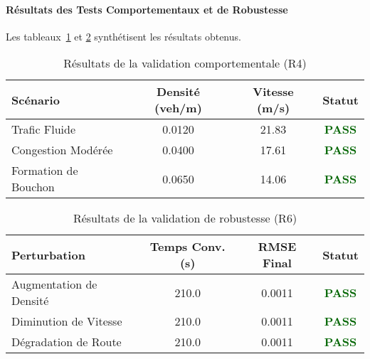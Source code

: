 \paragraph{Résultats des Tests Comportementaux et de Robustesse}

Les tableaux~\ref{tab:results_R4_behavioral} et \ref{tab:results_R6_robustness} synthétisent les résultats obtenus.

\begin{table}[htbp]
    \centering
    \caption{Résultats de la validation comportementale (R4)}
    \label{tab:results_R4_behavioral}
    \begin{tabular}{lccc}
        \toprule
        \textbf{Scénario}    & \textbf{Densité (veh/m)} & \textbf{Vitesse (m/s)} & \textbf{Statut}                  \\
        \midrule
        Trafic Fluide        & 0.0120                   & 21.83                  & \textcolor{darkgreen}{\textbf{PASS}} \\
        Congestion Modérée   & 0.0400                   & 17.61                  & \textcolor{darkgreen}{\textbf{PASS}} \\
        Formation de Bouchon & 0.0650                   & 14.06                  & \textcolor{darkgreen}{\textbf{PASS}} \\
        \bottomrule
    \end{tabular}
\end{table}

\begin{table}[htbp]
    \centering
    \caption{Résultats de la validation de robustesse (R6)}
    \label{tab:results_R6_robustness}
    \begin{tabular}{lccc}
        \toprule
        \textbf{Perturbation}   & \textbf{Temps Conv. (s)} & \textbf{RMSE Final} & \textbf{Statut}                  \\
        \midrule
        Augmentation de Densité & 210.0                    & 0.0011              & \textcolor{darkgreen}{\textbf{PASS}} \\
        Diminution de Vitesse   & 210.0                    & 0.0011              & \textcolor{darkgreen}{\textbf{PASS}} \\
        Dégradation de Route    & 210.0                    & 0.0011              & \textcolor{darkgreen}{\textbf{PASS}} \\
        \bottomrule
    \end{tabular}
\end{table}

